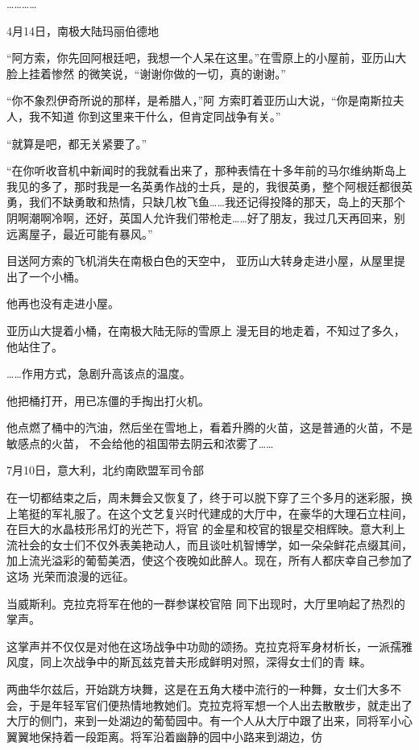 \documentclass{article}
\begin{document}
………… 



4月14日，南极大陆玛丽伯德地 

“阿方索，你先回阿根廷吧，我想一个人呆在这里。”在雪原上的小屋前，亚历山大脸上挂着惨然
的微笑说，“谢谢你做的一切，真的谢谢。” 

“你不象烈伊奇所说的那样，是希腊人，”阿
\newpage
方索盯着亚历山大说，“你是南斯拉夫人，我不知道
你到这里来干什么，但肯定同战争有关。” 


“就算是吧，都无关紧要了。” 

“在你听收音机中新闻时的我就看出来了，那种表情在十多年前的马尔维纳斯岛上我见的多了，那时我是一名英勇作战的士兵，是的，我很英勇，整个阿根廷都很英勇，我们不缺勇敢和热情，只缺几枚飞鱼……我还记得投降的那天，岛上的天那个阴啊潮啊冷啊，还好，英国人允许我们带枪走……好了朋友，我过几天再回来，别远离屋子，最近可能有暴风。”

目送阿方索的飞机消失在南极白色的天空中，
亚历山大转身走进小屋，从屋里提出了一个小桶。 


他再也没有走进小屋。 

亚历山大提着小桶，在南极大陆无际的雪原上
漫无目的地走着，不知过了多久，他站住了。 

\newpage


……作用方式，急剧升高该点的温度。 


他把桶打开，用已冻僵的手掏出打火机。 


他点燃了桶中的汽油，然后坐在雪地上，看着升腾的火苗，这是普通的火苗，不是敏感点的火苗，
不会给他的祖国带去阴云和浓雾了…… 








7月10日，意大利，北约南欧盟军司令部 

在一切都结束之后，周未舞会又恢复了，终于可以脱下穿了三个多月的迷彩服，换上笔挺的军礼服了。在这个文艺复兴时代建成的大厅中，在豪华的大理石立柱间，在巨大的水晶枝形吊灯的光芒下，将官
\newpage
的金星和校官的银星交相辉映。意大利上流社会的女士们不仅外表美艳动人，而且谈吐机智博学，如一朵朵鲜花点缀其间，加上流光溢彩的葡萄美洒，使这个夜晚如此醉人。现在，所有人都庆幸自己参加了这场
光荣而浪漫的远征。 

当威斯利。克拉克将军在他的一群参谋校官陪
同下出现时，大厅里响起了热烈的掌声。 

这掌声并不仅仅是对他在这场战争中功勋的颂扬。克拉克将军身材析长，一派孺雅风度，同上次战争中的斯瓦兹克普夫形成鲜明对照，深得女士们的青
睐。 

两曲华尔兹后，开始跳方块舞，这是在五角大楼中流行的一种舞，女士们大多不会，于是年轻军官们便热情地教她们。克拉克将军想一个人出去散散步，就走出了大厅的侧门，来到一处湖边的葡萄园中。有一个人从大厅中跟了出来，同将军小心翼翼地保持着一段距离。将军沿着幽静的园中小路来到湖边，仿
\end{document}
